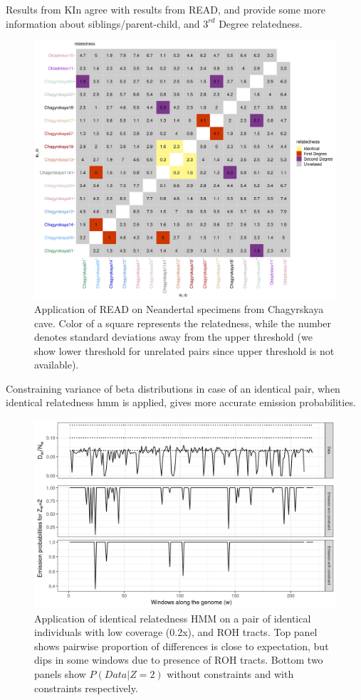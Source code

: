 \documentclass[12pt, letterpaper]{article}
\begin{document}
Results from KIn agree with results from READ, and provide some more information about siblings/parent-child, and $3^{rd}$ Degree relatedness. 
\begin{figure}[h]
    \centering
    \includegraphics[width=18cm]{supplementary_info/plots/fil0_read_plot.png}
    \caption{Application of READ on Neandertal specimens from Chagyrskaya cave. Color of a square represents the relatedness, while the number denotes standard deviations away from the upper threshold (we show lower threshold for unrelated pairs since upper threshold is not available).}
    \label{figS2}
\end{figure}

Constraining variance of beta distributions in case of an identical pair, when identical relatedness hmm is applied, gives more accurate emission probabilities.
\begin{figure}[h]
    \centering
    \includegraphics[width=18cm]{supplementary_info/plots/contam0_inbred1_run57_coverage0.2_asc0_inputMode_hapProbs_fil0_pair0_15_relid_emissions_bnds.png}
    \caption{Application of identical relatedness HMM on a pair of identical individuals with low coverage (0.2x), and ROH tracts. Top panel shows pairwise proportion of differences is close to expectation, but dips in some windows due to presence of ROH tracts. Bottom two panels show $P(Data|Z=2)$ without constraints and with constraints respectively.}
    \label{figS3}
\end{figure}
\end{document}
